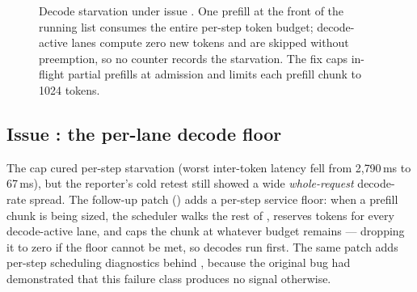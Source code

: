 \begin{figure}[htbp]
\centering
{}
\caption{Decode starvation under issue . One prefill at the front of
the running list consumes the entire per-step token budget; decode-active lanes
compute zero new tokens and are skipped without preemption, so no counter
records the starvation. The fix caps in-flight partial prefills at admission
and limits each prefill chunk to 1024 tokens.}
\label{fig:bugs-starvation}
\end{figure}

\subsection{Issue : the per-lane decode floor}

The  cap cured per-step starvation (worst inter-token latency fell
from 2{,}790\,ms to 67\,ms), but the reporter's cold retest still showed a wide
\emph{whole-request} decode-rate spread. The follow-up patch
() adds a
per-step service floor: when a prefill chunk is being sized, the scheduler
walks the rest of , reserves
 tokens for every decode-active lane, and
caps the chunk at whatever budget remains --- dropping it to zero if the floor
cannot be met, so decodes run first. The same patch adds per-step scheduling
diagnostics behind , because the original
bug had demonstrated that this failure class produces no signal otherwise.

